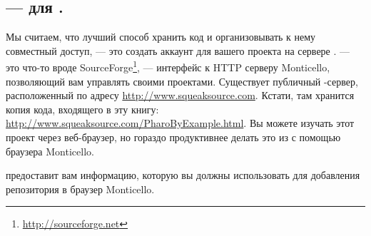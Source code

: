 \documentclass[a4paper,10pt,twoside]{book}
\begin{document}
{%


\subsection{\ind{\sqsrc} ---  для \pharo.} 
Мы считаем, что лучший способ хранить код и организовывать к нему совместный доступ, --- это создать аккаунт для вашего проекта на сервере \sqsrc.
\sqsrc --- это что-то вроде SourceForge\footnote{\url{http://sourceforge.net}}, --- интерфейс к HTTP серверу Monticello, позволяющий вам управлять своими проектами.
Существует публичный \sqsrc-сервер, расположенный по адресу \url{http://www.squeaksource.com}. Кстати, там хранится копия кода, входящего в эту книгу: \url{http://www.squeaksource.com/PharoByExample.html}. Вы можете изучать этот проект через веб-браузер, но гораздо продуктивнее делать это из \pharo с помощью браузера Monticello.

\dothis{Откройте в веб-браузере страницу \url{http://www.squeaksource.com}.
Создайте собственный аккаунт, и зарегистрируйте проект для нашей игры Lights Out.}
\sqsrc предоставит вам информацию, которую вы должны использовать для добавления репозитория в браузер Monticello.

}
\end{document}
